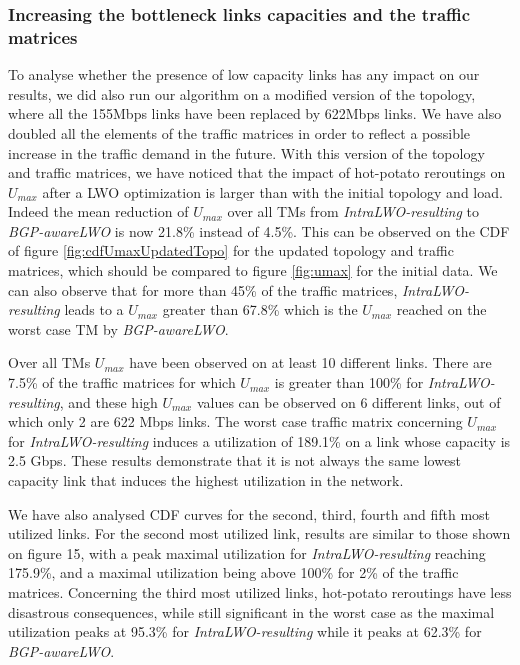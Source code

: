 \documentclass{acm_proc_article-sp}
\begin{document}
\subsubsection{Increasing the bottleneck links capacities and the traffic matrices}

To analyse whether the presence of low capacity links has any impact on our results, we did also run our
algorithm on a modified version of the topology, where all the 155Mbps links have
been replaced by 622Mbps links. We have also doubled all the elements of the traffic
matrices in order to reflect a possible increase in the traffic demand in
the future. With this version of the topology and traffic matrices, we have noticed that
the impact of hot-potato reroutings on $U_{max}$ after a LWO optimization is larger than with the
initial topology and load. Indeed the mean reduction of $U_{max}$ over all TMs from \textit{IntraLWO-resulting}
to \textit{BGP-awareLWO} is now 21.8\% instead of 4.5\%. This can be observed
on the CDF of figure \ref{fig:cdfUmaxUpdatedTopo} for the updated topology and
traffic matrices, which should be compared to figure \ref{fig:umax} for
the initial data. We can also observe that for more than 45\% of the traffic matrices,
\textit{IntraLWO-resulting} leads to a $U_{max}$ greater than 67.8\% which is the $U_{max}$
reached on the worst case TM by \textit{BGP-awareLWO}.

Over all TMs $U_{max}$ have been observed on at least 10 different links. There are 7.5\%
of the traffic matrices for which $U_{max}$
is greater than 100\% for \textit{IntraLWO-resulting}, and these high $U_{max}$ values
can be observed on 6 different links, out of which only 2 are 622 Mbps links.
The worst case traffic matrix concerning $U_{max}$ for \textit{IntraLWO-resulting}
induces a utilization of 189.1\% on a link whose capacity is 2.5 Gbps.
These results demonstrate that it is not always the same lowest capacity link that induces
the highest utilization in the network.

We have also analysed CDF curves for the second, third, fourth and fifth most utilized links.
For the second most utilized link, results are similar to those shown on figure 15, with a peak
maximal utilization for \textit{IntraLWO-resulting} reaching 175.9\%, and a maximal utilization
being above 100\% for 2\% of the traffic matrices. Concerning the third most utilized links,
hot-potato reroutings have less disastrous consequences, while still significant in the worst
case as the maximal utilization peaks at 95.3\% for \textit{IntraLWO-resulting} while it
peaks at 62.3\% for \textit{BGP-awareLWO}.
\end{document}
